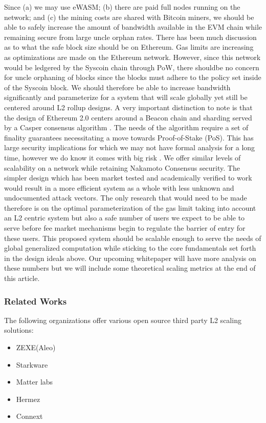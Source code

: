 \documentclass[peerreview]{ieeesyscoin}
\begin{document}
Since (a) we may use eWASM; (b) there are paid full nodes running on the network; and (c) the mining costs are shared with Bitcoin miners, we should be able to safely increase the amount of bandwidth available in the EVM chain while remaining secure from large uncle orphan rates. There has been much discussion as to what the safe block size should be on Ethereum. Gas limits are increasing as optimizations are made on the Ethereum network. However, since this network would be ledgered by the Syscoin chain through PoW, there shouldbe no concern for uncle orphaning of blocks since the blocks must adhere to the policy set inside of the Syscoin block. We should therefore be able to increase bandwidth significantly and parameterize for a system that will scale globally yet still be centered around L2 rollup designs. A very important distinction to note is that the design of Ethereum 2.0 centers around a Beacon chain and sharding served by a Casper consensus algorithm \cite{But17}. The needs of the algorithm require a set of finality guarantees necessitating a move towards Proof-of-Stake (PoS). This has large security implications for which we may not have formal analysis for a long time, however we do know it comes with big risk \cite{Neu21}.  We offer similar levels of scalability on a network while retaining Nakamoto Consensus security. The simpler design which has been market tested and academically verified to work would result in a more efficient system as a whole with less unknown and undocumented attack vectors. The only research that would need to be made therefore is on the optimal parameterization of the gas limit taking into account an L2 centric system but also a safe number of users we expect to be able to serve before fee market mechanisms begin to regulate the barrier of entry for these users. This proposed system should be scalable enough to serve the needs of global generalized computation while sticking to the core fundamentals set forth in the design ideals above. Our upcoming whitepaper will have more analysis on these numbers but we will include some theoretical scaling metrics at the end of this article.

\subsubsection{Related Works}


The following organizations offer various open source third party L2 scaling solutions:

\begin{itemize}
\item ZEXE(Aleo)
\item Starkware
\item Matter labs
\item Hermez
\item Connext
\end{itemize}
\end{document}
